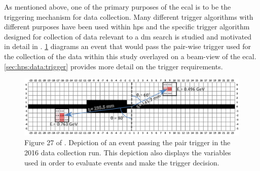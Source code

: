 As mentioned above, one of the primary purposes of the \ac{ecal} is to be the triggering mechanism
for data collection. Many different trigger algorithms with different purposes have been used
within \ac{hps} and the specific trigger algorithm designed for collection of data relevant to a
\ac{dm} search is studied and motivated in detail in \cite{skmccarty-thesis-2020}.
\cref{fig:hps-pair-trigger-depiction} diagrams an event that would pass the pair-wise trigger used
for the collection of the data within this study overlayed on a beam-view of the \ac{ecal}.
\cref{sec:hps:data:trigger} provides more detail on the trigger requirements.

\begin{figure}
  \centering
  \includegraphics[width=\textwidth]{figures/hps/experiment/smckarty-thesis-fig-27-pair-trigger-depiction.png}
  \caption{
    Figure 27 of \cite{skmccarty-thesis-2020}. Depiction of an event passing the pair trigger
    in the 2016 data collection run. This depiction also displays the variables used in order
    to evaluate events and make the trigger decision.
  }
  \label{fig:hps-pair-trigger-depiction}
\end{figure}

